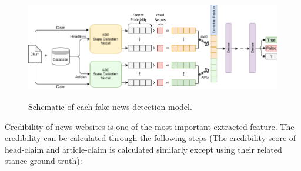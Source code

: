 \begin{figure}%
	\centering
	{\includegraphics[width=14.5cm]{statistics/schema/fn.png} }
	\caption{Schematic of each fake news detection model.}%
	\label{fig:fnschm}%
\end{figure}

Credibility of news websites is one of the most important extracted feature. The credibility can be calculated through the following steps (The credibility score of head-claim and article-claim is calculated similarly except using their related stance ground truth):


